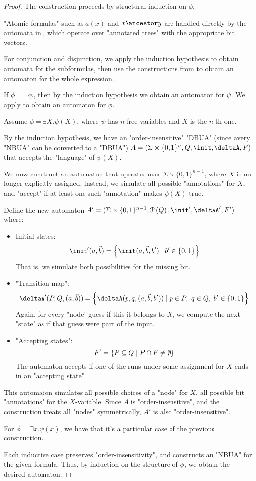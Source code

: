 \documentclass[a4paper,UKenglish,cleveref, autoref, thm-restate]{lipics-v2021}
\begin{document}
\begin{proof}
	The construction proceeds by structural induction on $\phi$.

	"Atomic formulas" such as $a(x)$ and $x \ancestor y$ are handled directly by the automata
	in , which operate over "annotated trees" with the appropriate bit vectors.

	For conjunction and disjunction, we apply the induction hypothesis to obtain automata
	for the subformulas, then use the constructions from  to obtain an automaton for the whole expression.

	If $\phi = \lnot \psi$, then by the induction hypothesis we obtain an automaton for $\psi$. We apply
	 to obtain an automaton for $\phi$.

	Assume $\phi = \exists X.\psi(X)$, where $\psi$ has $n$ free variables and $X$ is the $n$-th one.

	By the induction hypothesis, we have an "order-insensitive" "DBUA" (since avery "NBUA" can be converted to a "DBUA")
	$A = (\Sigma \times \{0,1\}^n, Q, \init, \deltaA, F)$ that accepts the "language" of $\psi(X)$.

	We now construct an automaton that operates over $\Sigma \times \{0,1\}^{n-1}$, where $X$ is no longer explicitly assigned.
	Instead, we simulate all possible "annotations" for $X$, and "accept" if at least one such "annotation" makes $\psi(X)$ true.

	Define the new automaton $A' = (\Sigma \times \{0,1\}^{n-1}, \parts Q, \init', \deltaA', F')$ where:
	\begin{itemize}
		\item Initial states:
		      \[
			      \init'(a, \vec{b}) = \setdef{ \init(a, \vec{b}, b')} {b' \in \{0,1\} }
		      \]
		      That is, we simulate both possibilities for the missing bit.
		\item "Transition map":
		      \[
			      \deltaA'(P, Q, (a, \vec{b})) = \setdef{ \deltaA(p, q, (a, \vec{b}, b'))} {p \in P,\ q \in Q,\ b' \in \{0,1\} }
		      \]
		      Again, for every "node" guess if this it belongs to $X$, we compute the next "state" as if that guess were part of the input.
		\item "Accepting states":
		      \[
			      F' = \left\{ P \subseteq Q \mid P \cap F \neq \emptyset \right\}
		      \]
		      The automaton accepts if one of the runs under some assignment for $X$ ends in an "accepting state".
	\end{itemize}

	This automaton simulates all possible choices of a "node" for $X$, \ie all possible  bit "annotations" for the $X$-variable.
	Since $A$ is "order-insensitive", and the construction treats all "nodes" symmetrically, $A'$ is also "order-insensitive".

	For $\phi = \exists x.\psi(x)$, we have that it's a particular case of the previous construction.

	Each inductive case preserves "order-insensitivity", and constructs an "NBUA" for the given formula. Thus, by induction on the structure of $\phi$,
	we obtain the desired automaton.
\end{proof}
\end{document}
